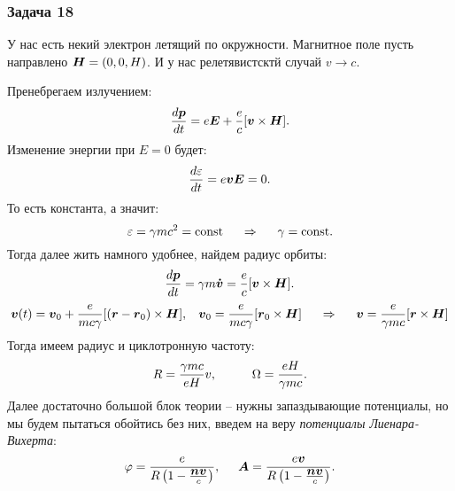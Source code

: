 \subsubsection*{Задача 18}
У нас есть некий электрон летящий по окружности. Магнитное поле пусть направлено  $\mbox{\boldmath $H$} = (0, 0, H)$. И у нас релетявистсктй случай $v \to c$.

Пренебрегаем излучением:
\begin{equation*}
	\frac{d \mbox{\boldmath $p$}}{d t} = e \mbox{\boldmath $E$} + \frac{e}{c}[\mbox{\boldmath $v$} \times \mbox{\boldmath $H$}].
\end{equation*}
Изменение энергии при $E = 0$ будет:
\begin{equation*}
	\frac{d \varepsilon}{d t} = e \mbox{\boldmath $v$} \mbox{\boldmath $E$} = 0.
\end{equation*}
То есть константа, а значит:
\begin{equation*}
	\varepsilon = \gamma mc^2 = \text{const}
	\hspace{0.5 cm}
	\Rightarrow
	\hspace{0.5 cm}
	\gamma = \text{const}.
\end{equation*}
Тогда далее жить намного удобнее, найдем радиус орбиты:
\begin{equation*}
	\frac{d \mbox{\boldmath $p$}}{d t} =  \gamma m \mbox{\boldmath $\dot{v}$} = \frac{e}{c} [\mbox{\boldmath $v$} \times \mbox{\boldmath $H$}].
\end{equation*}
\begin{equation*}
	\mbox{\boldmath $v$}(t) = \mbox{\boldmath $v$}_0 + \frac{e}{m c\gamma} [(\mbox{\boldmath $r$} - \mbox{\boldmath $r$}_0) \times \mbox{\boldmath $H$}],
	\hspace{0.3 cm}
	\mbox{\boldmath $v$}_0 =\frac{e}{m c\gamma} [\mbox{\boldmath $r$}_0 \times \mbox{\boldmath $H$}]
	\hspace{0.5 cm}
	\Rightarrow
	\hspace{0.5 cm}
	\mbox{\boldmath $v$} = \frac{e}{\gamma m c} [\mbox{\boldmath $r$} \times \mbox{\boldmath $H$}]
\end{equation*}
Тогда имеем радиус и циклотронную частоту:
\begin{equation*}
	R = \frac{\gamma mc}{e H}v,
	\hspace{1 cm}
	\Omega = \frac{e H}{\gamma mc}.
\end{equation*}
Далее достаточно большой блок теории -- нужны запаздывающие потенциалы, но мы будем пытаться обойтись без них, введем на веру \textit{потенциалы Лиенара-Вихерта}:
\begin{equation*}
	\varphi = \frac{e}{R \left(1 - \frac{\mbox{\boldmath $n$} \mbox{\boldmath $v$}}{c}\right)},
	\hspace{0.5 cm}
	\mbox{\boldmath $A$} = \frac{e \mbox{\boldmath $v$}}{R \left(1 - \frac{\mbox{\boldmath $n$} \mbox{\boldmath $v$}}{c}\right)}.
\end{equation*}

